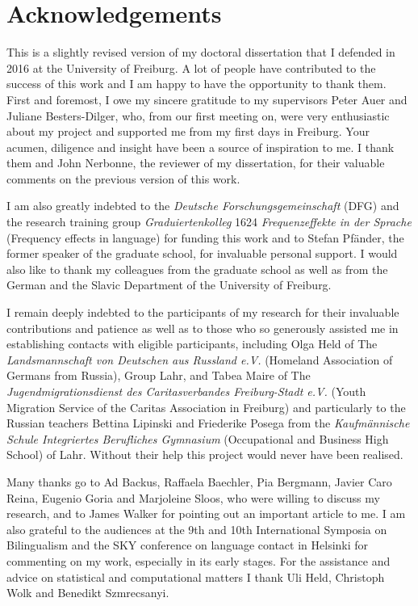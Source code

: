 \chapter*{Acknowledgements}\largerpage

This is a slightly revised version of my doctoral dissertation that I defended in 2016 at the University of Freiburg. A lot of people have contributed to the success of this work and I am happy to have the opportunity to thank them. First and foremost, I owe my sincere gratitude to my supervisors Peter Auer and Juliane Besters-Dilger, who, from our first meeting on, were very enthusiastic about my project and supported me from my first days in Freiburg. Your acumen, diligence and insight have been a source of inspiration to me. I thank them and John Nerbonne, the reviewer of my dissertation, for their valuable comments on the previous version of this work. 

 I am also greatly indebted to the \textit{Deutsche Forschungsgemeinschaft} (DFG) and the research training group \textit{Graduiertenkolleg} 1624 \textit{Frequenzeffekte in der Sprache} (Frequency effects in language) for funding this work and to Stefan Pfänder, the former speaker of the graduate school, for invaluable personal support. I would also like to thank my colleagues from the graduate school as well as from the German and the Slavic Department of the University of Freiburg.

I remain deeply indebted to the participants of my research for their invaluable contributions and patience as well as to those who so generously assisted me in establishing contacts with eligible participants, including Olga Held of The \textit{Landsmannschaft von Deutschen aus Russland e.V.} (Homeland Association of Germans from Russia), Group Lahr, and Tabea Maire of The \textit{Jugendmigrationsdienst des Caritasverbandes Freiburg-Stadt e.V.} (Youth Migration Service of the Caritas Association in Freiburg) and particularly to the Russian teachers Bettina Lipinski and Friederike Posega from the \textit{Kaufmännische Schule Integriertes Berufliches Gymnasium} (Occupational and Business High School) of Lahr. Without their help this project would never have been realised.

Many thanks go to Ad Backus, Raffaela Baechler, Pia Bergmann, Javier Caro Reina, Eugenio Goria and Marjoleine Sloos, who were willing to discuss my research, and to James Walker for pointing out an important article to me. I am also grateful to the audiences at the 9th and 10th International Symposia on Bilingualism and the SKY conference on language contact in Helsinki for commenting on my work, especially in its early stages. For the assistance and advice on statistical and computational matters I thank Uli Held, Christoph Wolk and Benedikt Szmrecsanyi.

